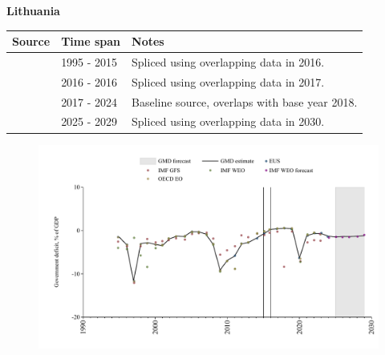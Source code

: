 \documentclass[12pt,a4paper,landscape]{article}
\begin{document}
\begin{adjustbox}{max totalsize={\paperwidth}{\paperheight},center}
\begin{minipage}[t][\textheight][t]{\textwidth}
\vspace*{0.5cm}
{}
\begin{center}
{\Large\bfseries Lithuania}
\end{center}
\vspace{0.5cm}
\begin{table}[H]
\centering
\small
\begin{tabular}{|l|l|l|}
\hline
\textbf{Source} & \textbf{Time span} & \textbf{Notes} \\
\hline
\rowcolor{white}\cite{EUS}& 1995 - 2015 &Spliced using overlapping data in 2016.\\
\rowcolor{lightgray}\cite{OECD_EO}& 2016 - 2016 &Spliced using overlapping data in 2017.\\
\rowcolor{white}\cite{EUS}& 2017 - 2024 &Baseline source, overlaps with base year 2018.\\
\rowcolor{lightgray}\cite{IMF_WEO_forecast}& 2025 - 2029 &Spliced using overlapping data in 2030.\\
\hline
\end{tabular}
\end{table}
\begin{figure}[H]
\centering
\includegraphics[width=\textwidth,height=0.6\textheight,keepaspectratio]{graphs/LTU_govdef_GDP.pdf}
\end{figure}
\end{minipage}
\end{adjustbox}
\end{document}
